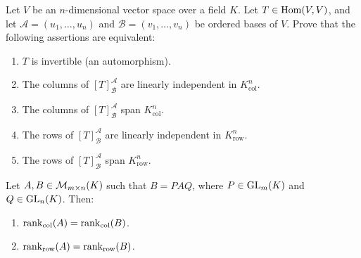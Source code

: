 \begin{exercise}
\label{exc:invertibility_characterizations_rep_matrix}
Let $V$ be an $n$-dimensional vector space over a field $K$. Let $T \in \operatorname{Hom}(V, V)$, and let $\mathcal{A} = (u_1, \dots, u_n)$ and $\mathcal{B} = (v_1, \dots, v_n)$ be ordered bases of $V$. Prove that the following assertions are equivalent:
\begin{enumerate}[label=\textbf{(\alph*)}]
    \item $T$ is invertible (an automorphism).
    \item The columns of $[T]_{\mathcal{B}}^{\mathcal{A}}$ are linearly independent in $K_{\mathrm{col}}^n$.
    \item The columns of $[T]_{\mathcal{B}}^{\mathcal{A}}$ span $K_{\mathrm{col}}^n$.
    \item The rows of $[T]_{\mathcal{B}}^{\mathcal{A}}$ are linearly independent in $K_{\mathrm{row}}^n$.
    \item The rows of $[T]_{\mathcal{B}}^{\mathcal{A}}$ span $K_{\mathrm{row}}^n$.
\end{enumerate}
\end{exercise}


\begin{lemma}
\label{lemma:rank_invariance_equivalence}
Let $A, B \in \mathcal{M}_{m \times n}(K)$ such that $B = P A Q$, where $P \in \operatorname{GL}_m(K)$ and $Q \in \operatorname{GL}_n(K)$. Then:
\begin{enumerate}[label=\textbf{(\alph*)}]
    \item $\operatorname{rank}_{\text{col}}(A) = \operatorname{rank}_{\text{col}}(B)$.
    \item $\operatorname{rank}_{\text{row}}(A) = \operatorname{rank}_{\text{row}}(B)$.
\end{enumerate}
\end{lemma}

